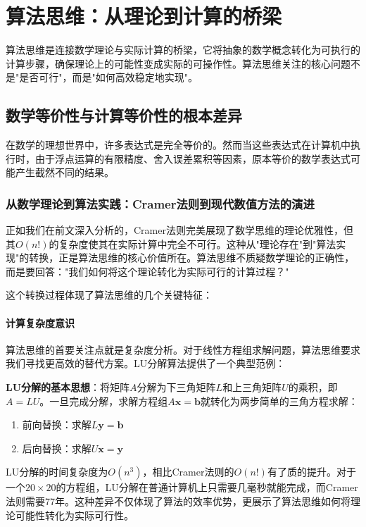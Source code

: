 \section{算法思维：从理论到计算的桥梁}

算法思维是连接数学理论与实际计算的桥梁，它将抽象的数学概念转化为可执行的计算步骤，确保理论上的可能性变成实际的可操作性。算法思维关注的核心问题不是"是否可行"，而是"如何高效稳定地实现"。

\subsection{数学等价性与计算等价性的根本差异}

在数学的理想世界中，许多表达式是完全等价的。然而当这些表达式在计算机中执行时，由于浮点运算的有限精度、舍入误差累积等因素，原本等价的数学表达式可能产生截然不同的结果。

\subsubsection{从数学理论到算法实践：Cramer法则到现代数值方法的演进}

正如我们在前文深入分析的，Cramer法则完美展现了数学思维的理论优雅性，但其$O(n!)$的复杂度使其在实际计算中完全不可行。这种从"理论存在"到"算法实现"的转换，正是算法思维的核心价值所在。算法思维不质疑数学理论的正确性，而是要回答："我们如何将这个理论转化为实际可行的计算过程？"

这个转换过程体现了算法思维的几个关键特征：

\paragraph{计算复杂度意识}
算法思维的首要关注点就是复杂度分析。对于线性方程组求解问题，算法思维要求我们寻找更高效的替代方案。LU分解算法提供了一个典型范例：

\textbf{LU分解的基本思想}：将矩阵$A$分解为下三角矩阵$L$和上三角矩阵$U$的乘积，即$A = LU$。一旦完成分解，求解方程组$A\mathbf{x} = \mathbf{b}$就转化为两步简单的三角方程求解：
\begin{enumerate}
\item 前向替换：求解$L\mathbf{y} = \mathbf{b}$
\item 后向替换：求解$U\mathbf{x} = \mathbf{y}$
\end{enumerate}

LU分解的时间复杂度为$O(n^3)$，相比Cramer法则的$O(n!)$有了质的提升。对于一个$20 \times 20$的方程组，LU分解在普通计算机上只需要几毫秒就能完成，而Cramer法则需要77年。这种差异不仅体现了算法的效率优势，更展示了算法思维如何将理论可能性转化为实际可行性。

